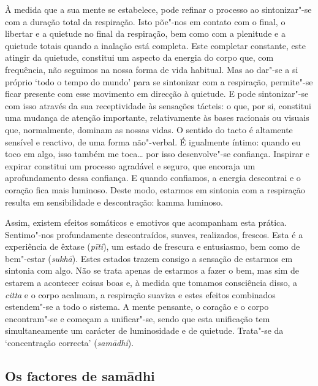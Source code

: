 À medida que a sua mente se estabelece, pode refinar o processo ao sintonizar"-se
com a duração total da respiração. Isto põe"-nos em contato com o final, o
libertar e a quietude no final da respiração, bem como com a plenitude e a
quietude totais quando a inalação está completa. Este completar constante, este
atingir da quietude, constitui um aspecto da energia do corpo que, com
frequência, não seguimos na nossa forma de vida habitual. Mas ao dar"-se a si
próprio `todo o tempo do mundo' para se sintonizar com a respiração, permite"-se
ficar presente com esse movimento em direcção à quietude. E pode sintonizar"-se
com isso através da sua receptividade às sensações tácteis: o que, por si,
constitui uma mudança de atenção importante, relativamente às bases racionais ou
visuais que, normalmente, dominam as nossas vidas. O sentido do tacto é
altamente sensível e reactivo, de uma forma não"-verbal. É igualmente íntimo:
quando eu toco em algo, isso também me toca\ldots{} por isso desenvolve"-se confiança.
Inspirar e expirar constitui um processo agradável e seguro, que encoraja um
aprofundamento dessa confiança. E quando confiamos, a energia descontrai e o
coração fica mais luminoso. Deste modo, estarmos em sintonia com a respiração
resulta em sensibilidade e descontração: kamma luminoso.

Assim, existem efeitos somáticos e emotivos que acompanham esta prática.
Sentimo"-nos profundamente descontraídos, suaves, realizados, frescos. Esta é a
experiência de êxtase (\emph{pīti}), um estado de frescura e entusiasmo, bem
como de bem"-estar (\emph{sukhā}). Estes estados trazem consigo a sensação de
estarmos em sintonia com algo. Não se trata apenas de estarmos a fazer o bem,
mas sim de estarem a acontecer coisas boas e, à medida que tomamos consciência
disso, a \emph{citta} e o corpo acalmam, a respiração suaviza e estes efeitos
combinados estendem"-se a todo o sistema. A mente pensante, o coração e o corpo
encontram"-se e começam a unificar"-se, sendo que esta unificação tem
simultaneamente um carácter de luminosidade e de quietude. Trata"-se da
`concentração correcta' (\emph{samādhi}).

\subsection{Os factores de samādhi}

